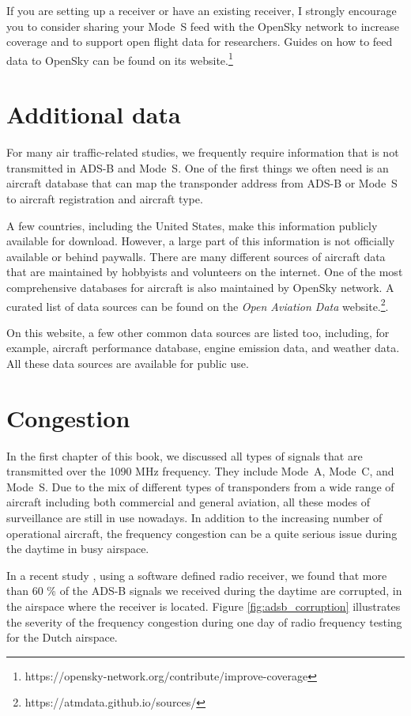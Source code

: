 If you are setting up a receiver or have an existing receiver, I strongly encourage you to consider sharing your Mode~S feed with the OpenSky network to increase coverage and to support open flight data for researchers. Guides on how to feed data to OpenSky can be found on its website.\footnote{https://opensky-network.org/contribute/improve-coverage}

\section{Additional data}

For many air traffic-related studies, we frequently require information that is not transmitted in ADS-B and Mode~S. One of the first things we often need is an aircraft database that can map the transponder address from ADS-B or Mode~S to aircraft registration and aircraft type. 

A few countries, including the United States, make this information publicly available for download. However, a large part of this information is not officially available or behind paywalls. There are many different sources of aircraft data that are maintained by hobbyists and volunteers on the internet. One of the most comprehensive databases for aircraft is also maintained by OpenSky network. A curated list of data sources can be found on the \emph{Open Aviation Data} website.\footnote{https://atmdata.github.io/sources/}.

On this website, a few other common data sources are listed too, including, for example, aircraft performance database, engine emission data, and weather data. All these data sources are available for public use.


\section{Congestion}
In the first chapter of this book, we discussed all types of signals that are transmitted over the 1090 MHz frequency. They include Mode~A, Mode~C, and Mode~S. Due to the mix of different types of transponders from a wide range of aircraft including both commercial and general aviation, all these modes of surveillance are still in use nowadays. In addition to the increasing number of operational aircraft, the frequency congestion can be a quite serious issue during the daytime in busy airspace. 

In a recent study \cite{sun2020rf}, using a software defined radio receiver, we found that more than 60 \% of the ADS-B signals we received during the daytime are corrupted, in the airspace where the receiver is located. Figure \ref{fig:adsb_corruption} illustrates the severity of the frequency congestion during one day of radio frequency testing for the Dutch airspace.

